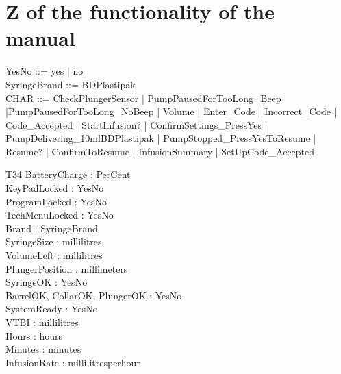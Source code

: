 \documentclass[landscape]{article}
\begin{document}
\section{Z of the functionality of the manual}

\begin{zed}
YesNo ::= yes | no\\
SyringeBrand ::= BDPlastipak\\
CHAR ::= CheckPlungerSensor | PumpPausedForTooLong\_Beep |PumpPausedForTooLong\_NoBeep | Volume | Enter\_Code | Incorrect\_Code | Code\_Accepted | StartInfusion? | ConfirmSettings\_PressYes | PumpDelivering\_10mlBDPlastipak | PumpStopped\_PressYesToResume | Resume? | ConfirmToResume | InfusionSummary | SetUpCode\_Accepted\\
\end{zed}




\begin{schema}{T34}
BatteryCharge : PerCent\\
KeyPadLocked : YesNo\\
ProgramLocked : YesNo\\
TechMenuLocked : YesNo\\
Brand : SyringeBrand\\
SyringeSize : millilitres\\
VolumeLeft : millilitres\\
PlungerPosition : millimeters \\
SyringeOK : YesNo\\
BarrelOK, CollarOK, PlungerOK : YesNo\\
SystemReady : YesNo\\
VTBI : millilitres\\
Hours : hours\\
Minutes : minutes\\
InfusionRate : millilitresperhour\\
\end{schema}
\end{document}
